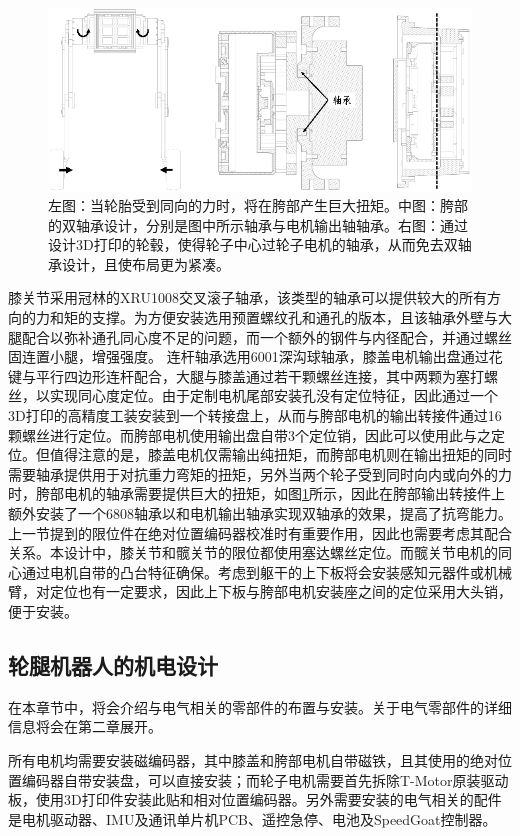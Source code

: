 \begin{figure}
  \centering
  \includegraphics[width=0.85\linewidth]{figures/Sec2/mech.png}
  \caption{
  左图：当轮胎受到同向的力时，将在胯部产生巨大扭矩。中图：胯部的双轴承设计，分别是图中所示轴承与电机输出轴轴承。右图：通过设计3D打印的轮毂，使得轮子中心过轮子电机的轴承，从而免去双轴承设计，且使布局更为紧凑。
  }
  \label{fig:sec2-mech}
   \vspace{6pt}
\end{figure}

膝关节采用冠林的XRU1008交叉滚子轴承，该类型的轴承可以提供较大的所有方向的力和矩的支撑。为方便安装选用预置螺纹孔和通孔的版本，且该轴承外壁与大腿配合以弥补通孔同心度不足的问题，而一个额外的钢件与内径配合，并通过螺丝固连置小腿，增强强度。
连杆轴承选用6001深沟球轴承，膝盖电机输出盘通过花键与平行四边形连杆配合，大腿与膝盖通过若干颗螺丝连接，其中两颗为塞打螺丝，以实现同心度定位。由于定制电机尾部安装孔没有定位特征，因此通过一个3D打印的高精度工装安装到一个转接盘上，从而与胯部电机的输出转接件通过16颗螺丝进行定位。而胯部电机使用输出盘自带3个定位销，因此可以使用此与之定位。但值得注意的是，膝盖电机仅需输出纯扭矩，而胯部电机则在输出扭矩的同时需要轴承提供用于对抗重力弯矩的扭矩，另外当两个轮子受到同时向内或向外的力时，胯部电机的轴承需要提供巨大的扭矩，如图\ref{fig:sec2-mech}所示，因此在胯部输出转接件上额外安装了一个6808轴承以和电机输出轴承实现双轴承的效果，提高了抗弯能力。
上一节提到的限位件在绝对位置编码器校准时有重要作用，因此也需要考虑其配合关系。本设计中，膝关节和髋关节的限位都使用塞达螺丝定位。而髋关节电机的同心通过电机自带的凸台特征确保。考虑到躯干的上下板将会安装感知元器件或机械臂，对定位也有一定要求，因此上下板与胯部电机安装座之间的定位采用大头销，便于安装。

\subsection{轮腿机器人的机电设计}
在本章节中，将会介绍与电气相关的零部件的布置与安装。关于电气零部件的详细信息将会在第二章展开。

所有电机均需要安装磁编码器，其中膝盖和胯部电机自带磁铁，且其使用的绝对位置编码器自带安装盘，可以直接安装；而轮子电机需要首先拆除T-Motor原装驱动板，使用3D打印件安装此贴和相对位置编码器。另外需要安装的电气相关的配件是电机驱动器、IMU及通讯单片机PCB、遥控急停、电池及SpeedGoat控制器。


